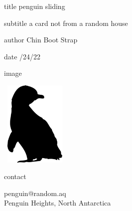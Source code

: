 \documentclass[12pt]{article}
\begin{document}
%
\begin{staticcontents*}{title}
\titlespecs
penguin sliding
\end{staticcontents*}

\begin{staticcontents*}{subtitle}
\subtitlespecs
a card not from a random house
\end{staticcontents*}

\begin{staticcontents*}{author}
\authorspecs
Chin Boot Strap\\
\end{staticcontents*}

\begin{staticcontents*}{date}
 /24/22
\end{staticcontents*} %

\begin{staticcontents*}{image}
 \imagespecs

\includegraphics[width=32.9mm,height=40.9mm]{image.png}

\end{staticcontents*} %

\begin{staticcontents*}{contact}
 \contactspecs

penguin@random.aq\\
Penguin Heights, North Antarctica

\end{staticcontents*} %
\end{document}
